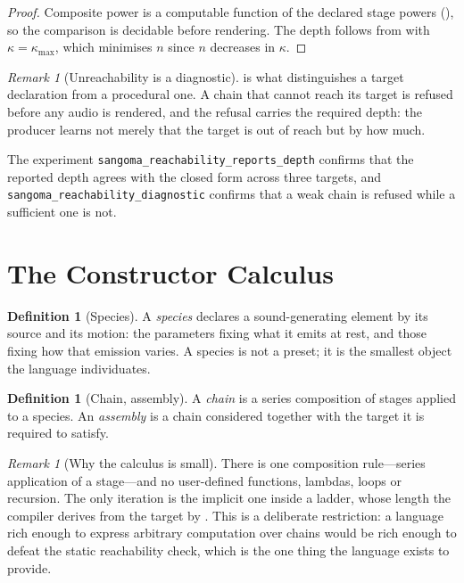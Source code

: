 \documentclass[11pt,twocolumn,a4paper]{article}
\theoremstyle{definition}
\newtheorem{definition}[theorem]{Definition}
\theoremstyle{remark}
\newtheorem{remark}[theorem]{Remark}
\newcommand{\pot}{\kappa}
\begin{document}
\begin{proof}
Composite power is a computable function of the declared stage powers
(), so the comparison is decidable before rendering. The depth
follows from  with $\pot=\pot_{\max}$, which minimises $n$
since $n$ decreases in $\pot$.
\end{proof}

\begin{remark}[Unreachability is a diagnostic]
\label{rem:diag}
 is what distinguishes a target declaration from a procedural
one. A chain that cannot reach its target is refused before any audio is
rendered, and the refusal carries the required depth: the producer learns not
merely that the target is out of reach but by how much.
\end{remark}

The experiment \texttt{sangoma\_reachability\_reports\_depth} confirms that the
reported depth agrees with the closed form across three targets, and
\texttt{sangoma\_reachability\_diagnostic} confirms that a weak chain is refused
while a sufficient one is not.

\section{The Constructor Calculus}
\label{sec:calculus}

\begin{definition}[Species]
\label{def:species}
A \emph{species} declares a sound-generating element by its source and its
motion: the parameters fixing what it emits at rest, and those fixing how that
emission varies. A species is not a preset; it is the smallest object the
language individuates.
\end{definition}

\begin{definition}[Chain, assembly]
\label{def:chain}
A \emph{chain} is a series composition of stages applied to a species. An
\emph{assembly} is a chain considered together with the target it is required to
satisfy.
\end{definition}

\begin{remark}[Why the calculus is small]
\label{rem:small}
There is one composition rule---series application of a stage---and no
user-defined functions, lambdas, loops or recursion. The only iteration is the
implicit one inside a ladder, whose length the compiler derives from the target
by . This is a deliberate restriction: a language rich enough
to express arbitrary computation over chains would be rich enough to defeat the
static reachability check, which is the one thing the language exists to provide.
\end{remark}
\end{document}
